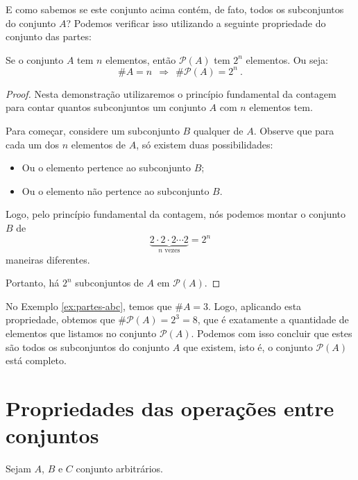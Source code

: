  E como sabemos se este conjunto acima contém, de fato, todos os subconjuntos do conjunto $A$? Podemos verificar isso utilizando a seguinte propriedade do conjunto das partes:

\begin{prop}
  Se o conjunto $A$ tem $n$ elementos, então $\mathcal{P}(A)$ tem $2^n$ elementos. Ou seja:
\begin{equation*}
\# A= n \ \ \Rightarrow \ \ \# \mathcal{P}(A)= 2^n \ .
\end{equation*}
\end{prop}
 \begin{proof}
 Nesta demonstração utilizaremos o princípio fundamental da contagem para contar quantos subconjuntos um conjunto $A$ com $n$ elementos tem.

 Para começar, considere um subconjunto $B$ qualquer de $A$. Observe que para cada um dos $n$ elementos de $A$, só existem duas possibilidades:
 \begin{itemize}
 \item Ou o elemento pertence ao subconjunto $B$;
 \item Ou o elemento não pertence ao subconjunto $B$.
 \end{itemize}

 Logo, pelo princípio fundamental da contagem, nós podemos montar o conjunto $B$ de
\begin{equation*}
\underbrace{2 \cdot 2 \cdot 2 \cdots 2}_{n \mbox{ vezes}}= 2^n
\end{equation*}
 maneiras diferentes.

 Portanto, há $2^n$ subconjuntos de $A$ em $\mathcal{P}(A)$.
 \end{proof}

 No Exemplo \ref{ex:partes-abc}, temos que $\# A= 3$. Logo, aplicando esta propriedade, obtemos que $\# \mathcal{P}(A)= 2^3= 8$, que é exatamente a quantidade de elementos que listamos no conjunto $\mathcal{P}(A)$. Podemos com isso concluir que estes são todos os subconjuntos do conjunto $A$ que existem, isto é, o conjunto $\mathcal{P}(A)$ está completo.


 \section{Propriedades das operações entre conjuntos}

Sejam $A$, $B$ e $C$ conjunto arbitrários.

